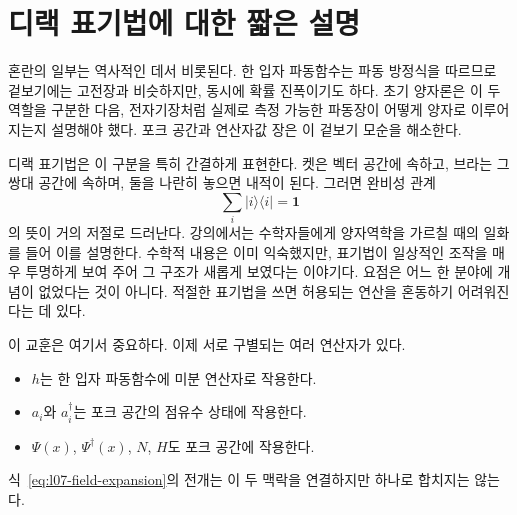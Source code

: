 \begin{classroomqa}
\end{classroomqa}

\section{디랙 표기법에 대한 짧은 설명}

혼란의 일부는 역사적인 데서 비롯된다. 한 입자 파동함수는 파동 방정식을 따르므로 겉보기에는 고전장과 비슷하지만, 동시에 확률 진폭이기도 하다. 초기 양자론은 이 두 역할을 구분한 다음, 전자기장처럼 실제로 측정 가능한 파동장이 어떻게 양자로 이루어지는지 설명해야 했다. 포크 공간과 연산자값 장은 이 겉보기 모순을 해소한다.

디랙 표기법은 이 구분을 특히 간결하게 표현한다. 켓은 벡터 공간에 속하고, 브라는 그 쌍대 공간에 속하며, 둘을 나란히 놓으면 내적이 된다. 그러면 완비성 관계
\begin{equation}
\sum_i|i\rangle\langle i|=\mathbf 1
\end{equation}
의 뜻이 거의 저절로 드러난다. 강의에서는 수학자들에게 양자역학을 가르칠 때의 일화를 들어 이를 설명한다. 수학적 내용은 이미 익숙했지만, 표기법이 일상적인 조작을 매우 투명하게 보여 주어 그 구조가 새롭게 보였다는 이야기다. 요점은 어느 한 분야에 개념이 없었다는 것이 아니다. 적절한 표기법을 쓰면 허용되는 연산을 혼동하기 어려워진다는 데 있다.

이 교훈은 여기서 중요하다. 이제 서로 구별되는 여러 연산자가 있다.
\begin{itemize}
\item \(h\)는 한 입자 파동함수에 미분 연산자로 작용한다.
\item \(a_i\)와 \(a_i^\dagger\)는 포크 공간의 점유수 상태에 작용한다.
\item \(\Psi(x)\), \(\Psi^\dagger(x)\), \(N\), \(H\)도 포크 공간에 작용한다.
\end{itemize}
식~\eqref{eq:l07-field-expansion}의 전개는 이 두 맥락을 연결하지만 하나로 합치지는 않는다.

\begin{classroomqa}
\end{classroomqa}

